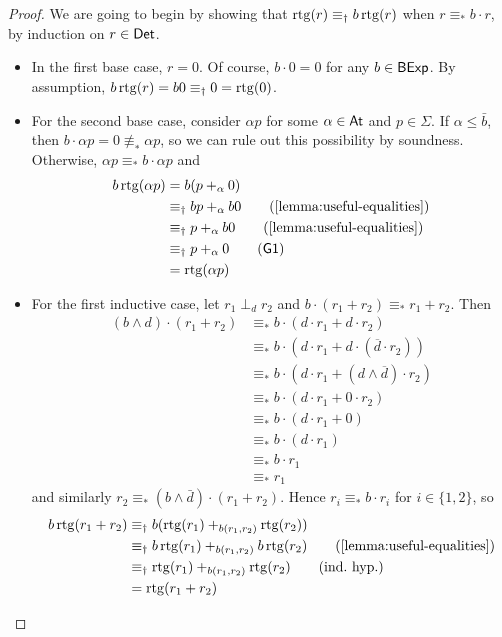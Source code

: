 \documentclass[orivec,envcountsect,envcountsame]{llncs}
\begin{document}
\begin{proof}
	We are going to begin by showing that \(\operatorname{rtg}(r) \equiv_\dagger b\operatorname{rtg}(r)\) when \(r \equiv_* b\cdot r\), by induction on \(r \in \mathsf{Det}\).
	\begin{itemize}
		\item
		In the first base case, \(r = 0\).
		Of course, \(b \cdot 0 = 0\) for any \(b \in \mathsf{BExp}\).
		By assumption, \(b\operatorname{rtg}(r) = b0 \equiv_\dagger 0 = \operatorname{rtg}(0)\).

		\item
		For the second base case, consider $\alpha p$ for some \(\alpha \in \mathsf{At}\) and \(p \in \Sigma\).
		If \(\alpha \le \bar b\), then \(b\cdot \alpha p = 0 \not\equiv_* \alpha p\), so we can rule out this possibility by soundness.
		Otherwise, \(\alpha p \equiv_* b\cdot \alpha p\) and
		\begin{align*}
			b\rtg(\alpha p)
			&= b(p +_\alpha  0) \\
			&\equiv_\dagger bp +_\alpha  b0 \tag{\cref{lemma:useful-equalities}}\\
			&\equiv_\dagger p+_\alpha b0 \tag{\cref{lemma:useful-equalities}} \\
			&\equiv_\dagger p+_\alpha 0 \tag{\textsf{G1}} \\
			&= \rtg(\alpha p)
		\end{align*}

		\item
		For the first inductive case, let \(r_1 \perp_d r_2\) and \(b\cdot (r_1 + r_2) \equiv_* r_1 + r_2\).
		Then
		\begin{align*}
			(b\wedge d)\cdot (r_1 + r_2)
			&\equiv_* b \cdot (d \cdot r_1 + d \cdot r_2) \\
			&\equiv_* b \cdot (d \cdot r_1 + d \cdot (\overline{d} \cdot r_2)) \\
			&\equiv_* b \cdot (d \cdot r_1 + (d \wedge \overline{d}) \cdot r_2) \\
			&\equiv_* b \cdot (d \cdot r_1 + 0 \cdot r_2) \\
			&\equiv_* b \cdot (d \cdot r_1 + 0) \\
			&\equiv_* b \cdot (d \cdot r_1) \\
			&\equiv_* b \cdot r_1 \\
			&\equiv_* r_1
		\end{align*}
		and similarly \(r_2 \equiv_* (b \wedge \bar d)\cdot (r_1 + r_2)\).
		Hence \(r_i \equiv_* b \cdot r_i\) for \(i\in\{1,2\}\), so
		\begin{align*}
			b\rtg(r_1 + r_2)
			&\equiv_\dagger b(\rtg(r_1) +_{b(r_1, r_2)} \rtg(r_2)) \\
			&\equiv_\dagger b\rtg(r_1) +_{b(r_1,r_2)} b\rtg(r_2) \tag{\cref{lemma:useful-equalities}} \\
			&\equiv_\dagger \rtg(r_1) +_{b(r_1, r_2)} \rtg(r_2) \tag{ind.~hyp.} \\
			&= \rtg(r_1 + r_2)
		\end{align*}


\end{itemize}
\end{proof}
\end{document}
